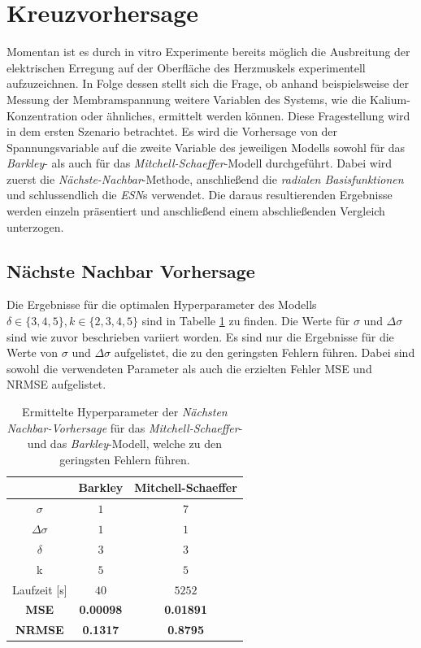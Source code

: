\section{Kreuzvorhersage}
\label{sec:exp_cross_pred}
Momentan ist es durch in vitro Experimente bereits möglich die Ausbreitung der elektrischen Erregung auf der Oberfläche des Herzmuskels experimentell aufzuzeichnen. In Folge dessen stellt sich die Frage, ob anhand beispielsweise der Messung der Membramspannung weitere Variablen des Systems, wie die Kalium-Konzentration oder ähnliches, ermittelt werden können. Diese Fragestellung wird in dem ersten Szenario betrachtet. Es wird die Vorhersage von der Spannungsvariable auf die zweite Variable des jeweiligen Modells sowohl für das \textit{Barkley}- als auch für das \textit{Mitchell-Schaeffer}-Modell durchgeführt. Dabei wird zuerst die \textit{Nächste-Nachbar}-Methode, anschließend die \textit{radialen Basisfunktionen} und schlussendlich die \textit{ESN}s verwendet. Die daraus resultierenden Ergebnisse werden einzeln präsentiert und anschließend einem abschließenden Vergleich unterzogen.
 
\subsection{Nächste Nachbar Vorhersage}
Die Ergebnisse für die optimalen Hyperparameter des Modells $\delta \in \{3,4,5\}, k \in \{2, 3, 4, 5\}$ sind in Tabelle \ref{tab:exp_cross_nn_results} zu finden. Die Werte für $\sigma$ und $\Delta \sigma$ sind wie zuvor beschrieben variiert worden. Es sind nur die Ergebnisse für die Werte von $\sigma$ und $\Delta \sigma$ aufgelistet, die zu den geringsten Fehlern führen. Dabei sind sowohl die verwendeten Parameter als auch die erzielten Fehler MSE und NRMSE aufgelistet.
\begin{table}[h]
	\centering

	\begin{tabular}{ccc}
		\hline		
		\multicolumn{1}{c}{} & Barkley & Mitchell-Schaeffer \\ 
		\hline 
		\rule[-1ex]{0pt}{2.5ex} $\sigma$ & $1$ & $7$ \\ 
		\rule[-1ex]{0pt}{2.5ex} $\Delta \sigma$ & $1$ & $1$ \\ 
		\rule[-1ex]{0pt}{2.5ex} $\delta$ & $3$ & $3$ \\ 
		\rule[-1ex]{0pt}{2.5ex} k & $5$ & $5$ \\ 
		\rule[-1ex]{0pt}{2.5ex} Laufzeit [s] & $40$ & $5252$ \\ 
		\rule[-1ex]{0pt}{2.5ex} \textbf{MSE} & \textbf{0.00098} & \textbf{0.01891} \\ 
		\rule[-1ex]{0pt}{2.5ex} \textbf{NRMSE} & \textbf{0.1317} & \textbf{0.8795} \\ 
		\hline 
	\end{tabular} 

	\caption{Ermittelte Hyperparameter der \textit{Nächsten Nachbar-Vorhersage} für das \textit{Mitchell-Schaeffer}- und das \textit{Barkley}-Modell, welche zu den geringsten Fehlern führen.}
\label{tab:exp_cross_nn_results}
\end{table} 


